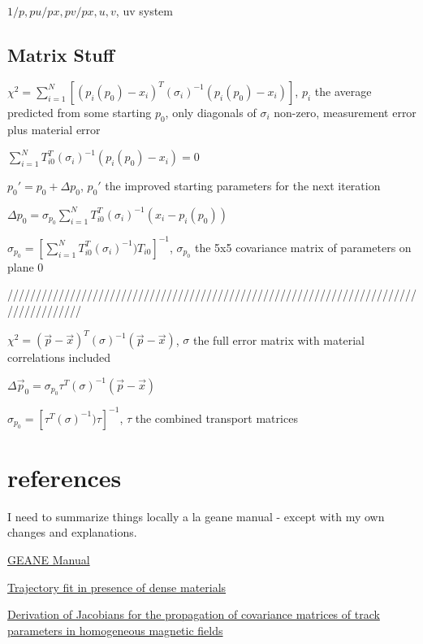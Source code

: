 \documentclass{article}
\begin{document}
$1/p, pu/px, pv/px, u, v$, uv system


\subsection{Matrix Stuff}


$\chi^2 = \sum_{i=1}^{N} [(p_{i}(p_{0})-x_{i})^{T}(\sigma_{i})^{-1}(p_{i}(p_{0})-x_{i})]$, $p_{i}$ the average predicted from some starting $p_{0}$, only diagonals of $\sigma_{i}$ non-zero, measurement error plus material error

$\sum_{i=1}^{N} T^{T}_{i0}(\sigma_{i})^{-1}(p_{i}(p_{0})-x_{i}) = 0$

$p_{0}' = p_{0} + \Delta p_{0}$, $p_{0}'$ the improved starting parameters for the next iteration

$\Delta p_{0} = \sigma_{p_{0}} \sum_{i=1}^{N} T^{T}_{i0}(\sigma_{i})^{-1}(x_{i} - p_{i}(p_{0}))$

$\sigma_{p_{0}} = [\sum_{i=1}^{N} T^{T}_{i0} (\sigma_{i})^{-1}) T_{i0} ]^{-1}$, $\sigma_{p_{0}}$ the 5x5 covariance matrix of parameters on plane 0

/////////////////////////////////////////////////////////////////////////////////////

$\chi^2 = (\vec{p}-\vec{x})^{T} (\sigma)^{-1} (\vec{p}-\vec{x})$, $\sigma$ the full error matrix with material correlations included

$\Delta \vec{p}_{0} = \sigma_{p_{0}} \tau^{T}(\sigma)^{-1}(\vec{p}-\vec{x})$

$\sigma_{p_{0}} = [\tau^{T} (\sigma)^{-1}) \tau ]^{-1}$, $\tau$ the combined transport matrices






\section{references}

  I need to summarize things locally a la geane manual - except with my own changes and explanations.

	\href{http://innocentonnice.web.cern.ch/innocentonnice/napoli99/geane_manual.ps}{GEANE Manual}

	\href{http://www.sciencedirect.com/science/article/pii/016890029390992Q}{Trajectory fit in presence of dense materials}

	\href{http://www.sciencedirect.com/science/article/pii/S0168900206013143}{Derivation of Jacobians for the propagation of covariance matrices of track parameters in homogeneous magnetic fields}
\end{document}
